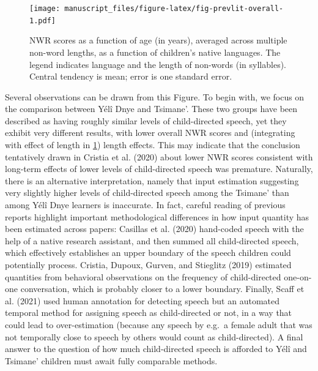 \documentclass[english,,man,floatsintext]{apa6}
\begin{document}
\begin{figure}
\centering
\texttt{[image: manuscript\_files/figure-latex/fig-prevlit-overall-1.pdf]}
\caption{\label{fig:fig-prevlit-overall}NWR scores as a function of age (in years), averaged across multiple non-word lengths, as a function of children's native languages. The legend indicates language and the length of non-words (in syllables). Central tendency is mean; error is one standard error.}
\end{figure}

Several observations can be drawn from this Figure. To begin with, we focus on the comparison between Yélî Dnye and Tsimane'. These two groups have been described as having roughly similar levels of child-directed speech, yet they exhibit very different results, with lower overall NWR scores and (integrating with effect of length in \ref{fig:fig-prevlit-overall}) length effects. This may indicate that the conclusion tentatively drawn in Cristia et al. (2020) about lower NWR scores consistent with long-term effects of lower levels of child-directed speech was premature. Naturally, there is an alternative interpretation, namely that input estimation suggesting very slightly higher levels of child-directed speech among the Tsimane' than among Yélî Dnye learners is inaccurate. In fact, careful reading of previous reports highlight important methodological differences in how input quantity has been estimated across papers: Casillas et al. (2020) hand-coded speech with the help of a native research assistant, and then summed all child-directed speech, which effectively establishes an upper boundary of the speech children could potentially process. Cristia, Dupoux, Gurven, and Stieglitz (2019) estimated quantities from behavioral observations on the frequency of child-directed one-on-one conversation, which is probably closer to a lower boundary. Finally, Scaff et al. (2021) used human annotation for detecting speech but an automated temporal method for assigning speech as child-directed or not, in a way that could lead to over-estimation (because any speech by e.g.~a female adult that was not temporally close to speech by others would count as child-directed). A final answer to the question of how much child-directed speech is afforded to Yélî and Tsimane' children must await fully comparable methods.
\end{document}
